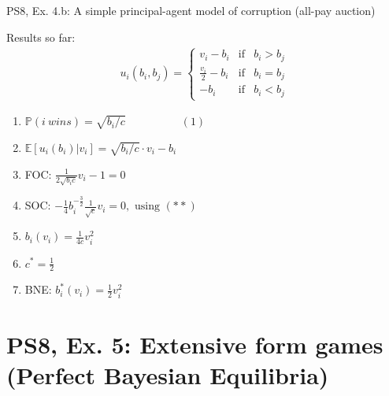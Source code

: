 \begin{frame}{PS8, Ex. 4.b: A simple principal-agent model of corruption (all-pay auction)}
\begin{multicols}{2}
      \vspace{-6pt}
      Results so far: \vspace{-6pt}
      \begin{align*}
        u_i(b_i,b_j)=\left\{\begin{array}{lcl}
          v_i-b_i           & \text{if} & b_i>b_j \\
          \frac{v_i}{2}-b_i & \text{if} & b_i=b_j \\
          -b_i              & \text{if} & b_i<b_j
        \end{array}\right.
      \end{align*} \vspace{-16pt}
      \begin{enumerate}
        \item $\mathbb{P}(i\ wins)=\sqrt{b_i/c}\quad\quad\quad\quad\quad(1)$
        \item $\mathbb{E}[u_i(b_i)|v_i]=\sqrt{b_i/c}\cdot v_i-b_i$
        \item FOC: $\frac{1}{2\sqrt{b_ic}}v_i-1=0$
        \item[] SOC: $-\frac{1}{4}b_i^{-\frac{3}{2}}\frac{1}{\sqrt{c}}v_i=0,\text{ using }(**)$
        \item $b_i(v_i)=\frac{1}{4c}v_i^2$
        \item $c^*=\frac{1}{2}$
        \item BNE: $b_i^*(v_i)=\frac{1}{2}v_i^2$
      \end{enumerate}
      \vfill\null
    \end{multicols}
\end{frame}



\section{PS8, Ex. 5: Extensive form games (Perfect Bayesian Equilibria)}

